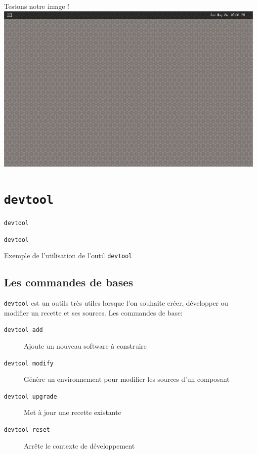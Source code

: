\documentclass[compress]{smilebeamer}
\begin{document}
\begin{frame}
\begin{center}
\huge{Testons notre image !}
\includegraphics[width=1\textwidth]{images/weston-desktop.png}
\end{center}
\end{frame}


\section{\texttt{devtool}}

\begin{frame}{\texttt{devtool}}
\end{frame}

\begin{frame}{\texttt{devtool}}
\begin{center}
\textcolor{smileOrange}{\huge{Exemple de l'utilisation de l'outil \texttt{devtool}}}
\end{center}
\end{frame}

\subsection{Les commandes de bases}

\begin{frame}
\texttt{devtool} est un outils très utiles lorsque l'on souhaite créer, développer ou modifier un recette et ses sources.\newline
\newline
Les commandes de base:
\begin{description}
	\item[\texttt{devtool add}] Ajoute un nouveau software à construire
	\item[\texttt{devtool modify}] Génère un environnement pour modifier les sources d'un composant
	\item[\texttt{devtool upgrade}] Met à jour une recette existante
	\item[\texttt{devtool reset}] Arrête le contexte de développement
\end{description}
\end{frame}
\end{document}

